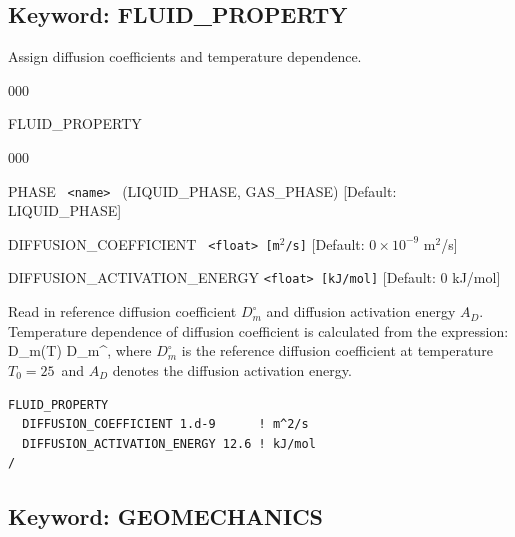 \newpage
\protect\hypertarget{target_fluid_property}{}

\subsection{Keyword: FLUID\_PROPERTY}

\hfill\hyperlink{target_key}{\return}

 Assign diffusion coefficients and temperature dependence.

\begin{deflist}{000}
\item[FLUID\_PROPERTY]~
\begin{deflist}{000}
\item[PHASE] \ {\tt <name>} \ (LIQUID\_PHASE, GAS\_PHASE) [Default: LIQUID\_PHASE]
\item[DIFFUSION\_COEFFICIENT] \ {\tt <float> [m$^2$/s]} [Default: $0\times 10^{-9}$ m$^2$/s]
\item[DIFFUSION\_ACTIVATION\_ENERGY] {\tt <float> [kJ/mol]} [Default: 0 kJ/mol]
\end{deflist}
\item[\keyend]
\end{deflist}

 Read in reference diffusion coefficient $D_m^\circ$ and diffusion activation energy $A_D$. Temperature dependence of diffusion coefficient is calculated from the expression:
\EQ
D_m(T) \eq D_m^\circ\exp{},
\EN
where $D_m^\circ$ is the reference diffusion coefficient at temperature $T_0 = 25$\degc\ and $A_D$ denotes the diffusion activation energy.

\begin{mdframed}

\footnotesize
\begin{verbatim}
FLUID_PROPERTY
  DIFFUSION_COEFFICIENT 1.d-9      ! m^2/s
  DIFFUSION_ACTIVATION_ENERGY 12.6 ! kJ/mol
/
\end{verbatim}
\normalsize
\end{mdframed}

\hyperlink{target_key}{\return}


\newpage
\protect\hypertarget{target_geomech}{}
 
\subsection{Keyword: GEOMECHANICS}

